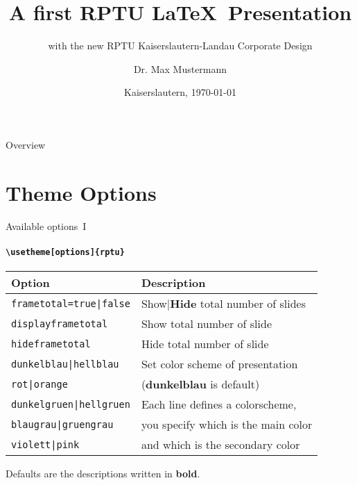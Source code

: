 \documentclass[]{beamer}
\title[RPTU \LaTeX\ Presentation]{A first RPTU \LaTeX\ Presentation}
\subtitle{with the new RPTU Kaiserslautern-Landau Corporate Design}
\date{Kaiserslautern, \today}
\author[Mustermann]{Dr. Max Mustermann}
\institute[Mathematik]{AG Statistik, FB Mathematik}
\begin{document}
\begin{frame}
\titlepage
\end{frame}

\begin{frame}{Overview}
	\tableofcontents
\end{frame}

\section{Theme Options}
\rptusectionpage

\begin{frame}{Available options~I}
\framesubtitle{\texttt{\textbackslash usetheme[options]\{rptu\}}}
	\begin{tabular}{ll}
		\textbf{Option} & \textbf{Description}\\ \hline
		\texttt{frametotal=true|false} &Show|\textbf{Hide} total number of slides \\
		\texttt{displayframetotal} & Show total number of slide \\ 
		\texttt{hideframetotal} & Hide total number of slide \\  \hline
		\texttt{dunkelblau|hellblau} & Set color scheme of presentation\\
		\texttt{rot|orange} & (\textbf{dunkelblau} is default)\\
		\texttt{dunkelgruen|hellgruen} & Each line defines a colorscheme,\\
		\texttt{blaugrau|gruengrau} & you specify which is the main color\\ 
		\texttt{violett|pink} & and which is the secondary color\\ 
	\end{tabular}
	\vspace*{2ex}
	
	Defaults are the descriptions written in \textbf{bold}.
\end{frame}
\end{document}
